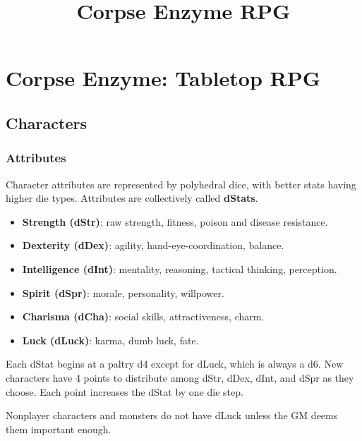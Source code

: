 \documentclass[10pt,twoside,twocolumn,openany]{book}
\begin{document}
\selectfont %

\title{Corpse Enzyme RPG}

\newcommand{\damage}[0]{\tikz\draw[red,fill=red] (0,0) circle (.5ex); }

\newcommand{\shiftleft}[0]{\color{violet}\Large$\boldsymbol\blacktriangleleft$\normalsize\color{black} }

\newcommand{\shiftright}[0]{\color{orange}\Large$\boldsymbol\blacktriangleright$\normalsize\color{black} }

\newcommand{\shiftcenter}[0]{\color{red}\Large$\boldsymbol\blacktriangleright|\boldsymbol\blacktriangleleft$\normalsize\color{black} }

\newcommand{\shiftout}[0]{\shiftleft$|$\shiftright }

\chapter{Corpse Enzyme: Tabletop RPG}
\section{Characters}
\subsection{Attributes}
Character attributes are represented by polyhedral dice, with better stats having higher die types. Attributes are collectively called \textbf{dStats}.
\begin{itemize}
\item \textbf{Strength (dStr)}: raw strength, fitness, poison and disease resistance.
\item \textbf{Dexterity (dDex)}: agility, hand-eye-coordination, balance.
\item \textbf{Intelligence (dInt)}: mentality, reasoning, tactical thinking, perception.
\item \textbf{Spirit (dSpr)}: morale, personality, willpower.
\item \textbf{Charisma (dCha)}: social skills, attractiveness, charm.
\item \textbf{Luck (dLuck)}: karma, dumb luck, fate.
\end{itemize}

Each dStat begins at a paltry d4 except for dLuck, which is always a d6. New characters have 4 points to distribute among dStr, dDex, dInt, and dSpr as they choose. Each point increases the dStat by one die step.
\par Nonplayer characters and monsters do not have dLuck unless the GM deems them important enough.
\end{document}
